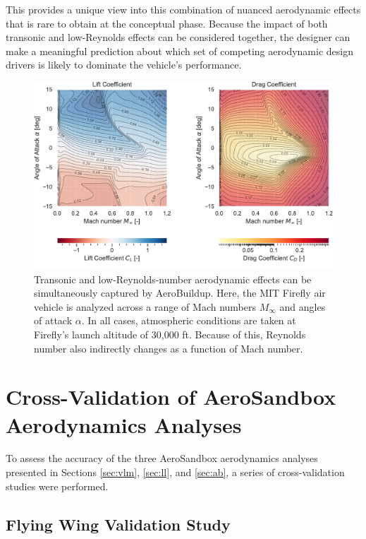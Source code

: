 \noindent This provides a unique view into this combination of nuanced aerodynamic effects that is rare to obtain at the conceptual phase. Because the impact of both transonic and low-Reynolds effects can be considered together, the designer can make a meaningful prediction about which set of competing aerodynamic design drivers is likely to dominate the vehicle's performance.

\begin{figure}[!htb]
    \centering
    \includegraphics[width=\textwidth]{../figures/aerobuildup_figs/transonic.pdf}
    \caption{Transonic and low-Reynolds-number aerodynamic effects can be simultaneously captured by AeroBuildup. Here, the MIT Firefly air vehicle is analyzed across a range of Mach numbers $M_\infty$ and angles of attack $\alpha$. In all cases, atmospheric conditions are taken at Firefly's launch altitude of 30,000 ft. Because of this, Reynolds number also indirectly changes as a function of Mach number.}
    \label{fig:ab_transonic}
\end{figure}



\section{Cross-Validation of AeroSandbox Aerodynamics Analyses}

To assess the accuracy of the three AeroSandbox aerodynamics analyses presented in Sections \ref{sec:vlm}, \ref{sec:ll}, and \ref{sec:ab}, a series of cross-validation studies were performed.

\subsection{Flying Wing Validation Study}

